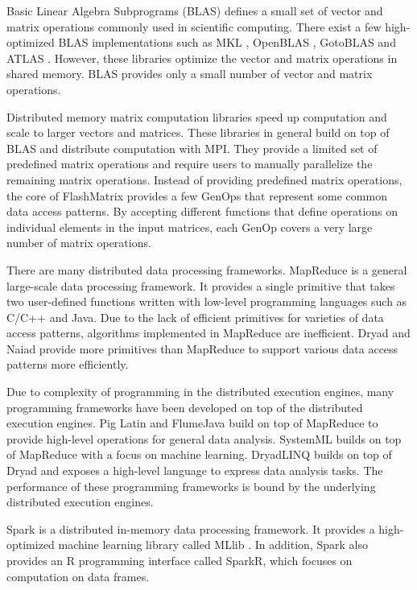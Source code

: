 Basic Linear Algebra Subprograms (BLAS) defines a small set of vector and
matrix operations commonly used in scientific computing. There exist a few
high-optimized BLAS implementations such as MKL \cite{mkl}, OpenBLAS
\cite{openblas}, GotoBLAS \cite{Goto} and ATLAS \cite{atlas}. However, these
libraries optimize the vector and matrix operations in shared memory. BLAS
provides only a small number of vector and matrix operations.

Distributed memory matrix computation libraries \cite{trilinos, petsc, elemental}
speed up computation and scale to larger vectors and matrices. These libraries
in general build on top of BLAS and distribute computation with MPI.
They provide a limited set of predefined matrix operations and
require users to manually parallelize the remaining matrix operations. Instead
of providing predefined matrix operations, the core of FlashMatrix provides
a few GenOps that represent some common data access patterns. By accepting
different functions that define operations on individual elements in the input
matrices, each GenOp covers a very large number of matrix operations.

There are many distributed data processing frameworks.
MapReduce \cite{mapreduce} is a general large-scale data processing framework.
It provides a single primitive that takes two user-defined functions written with
low-level programming languages such as C/C++ and Java. Due to the lack of
efficient primitives for varieties of data access patterns, algorithms
implemented in MapReduce are inefficient. Dryad \cite{dryad} and
Naiad \cite{naiad} provide more primitives than MapReduce to support various
data access patterns more efficiently.

Due to complexity of programming in the distributed execution engines, many
programming frameworks have been developed on top of the distributed execution
engines. Pig Latin \cite{pig} and FlumeJava \cite{flumejava} build on top of
MapReduce to provide high-level operations for general data analysis. SystemML
\cite{systemml} builds on top of MapReduce with a focus on machine learning.
DryadLINQ \cite{dryadlinq} builds on top of Dryad and exposes a high-level
language to express data analysis tasks. The performance of these programming
frameworks is bound by the underlying distributed execution engines.

Spark \cite{spark} is a distributed in-memory data processing framework.
It provides a high-optimized machine learning library called MLlib \cite{mllib}.
In addition, Spark also provides an R programming interface called SparkR, which
focuses on computation on data frames.

